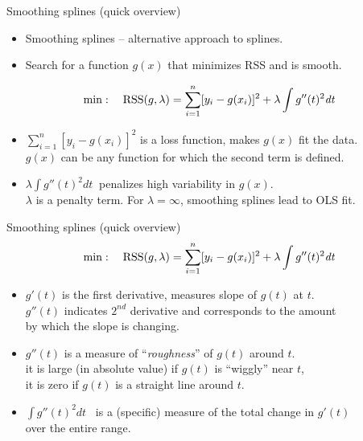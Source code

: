 \documentclass{beamer}
\begin{document}
\begin{frame}{Smoothing splines (quick overview)}
\begin{itemize}
    \item Smoothing splines -- alternative approach to splines.\\
    \bigskip
    \item Search for a function $g(x)$ that minimizes RSS and is smooth.
\end{itemize} \medskip
$$\min:~~~\textnormal{RSS}(g,\lambda) = \sum_{i=1}^n [y_i - g(x_i)]^2 + \lambda \int g''(t)^2 \textit{dt}$$
\begin{itemize}
    \item $\sum_{i=1}^n [y_i - g(x_i)]^2$ is a loss function, makes $g(x)$ fit the data.\\  \smallskip
    $g(x)$ can be any function for which the second term is defined.\\
    \bigskip
    \item $\lambda \int \! g''(t)^2 \textit{dt}~$ penalizes high variability in $g(x)$.\\  \smallskip
    $\lambda$ is a penalty term. For $\lambda=\infty$, smoothing splines lead to OLS fit.
\end{itemize}
\end{frame}
\begin{frame}{Smoothing splines (quick overview)}
$$\min:~~~\textnormal{RSS}(g,\lambda) = \sum_{i=1}^n [y_i - g(x_i)]^2 + \lambda \int g''(t)^2 \textit{dt}$$
\begin{itemize}
    \item $g'(t)$ is the first derivative, measures slope of $g(t)$ at $t$.\\
    \smallskip
    $g''(t)$ indicates $2^{nd}$ derivative and corresponds to the amount \\by which the slope is changing.
    \medskip
    \item $g''(t)$ is a measure of ``\textit{roughness}'' of $g(t)$ around $t$.\\
    \smallskip
    it is large (in absolute value) if $g(t)$ is ``wiggly'' near $t$,\\
    \smallskip
    it is zero if $g(t)$ is a straight line around $t$.
    \medskip
    \item $\int g''(t)^2 \textit{dt}$ ~is a (specific) measure of the total change in $g'(t)$ \\over the entire range. 
\end{itemize}
\end{frame}
\end{document}
